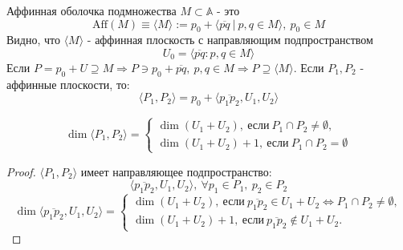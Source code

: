 \begin{definition}
    Аффинная оболочка подмножества $M\subset \mathbb{A}$ - это
    \[\text{Aff}(M)\equiv \langle M \rangle:=p_0+\langle\overline{pq} \ | \ p,q\in M\rangle,\ p_0\in M\]
    Видно, что $\langle M \rangle$ - аффинная плоскость с направляющим подпространством  
    \[U_0=\langle\overline{pq}: p,q\in M\rangle\]
    Если $P=p_0+U\supseteq M \Longrightarrow P\ni p_0+\overline{pq},\ p,q\in M \Longrightarrow P\supseteq \langle M \rangle$.
    Если $P_1, P_2$ - аффинные плоскости, то:
    \[\langle P_1,P_2 \rangle=p_0+\langle \overline{p_1p_2}, U_1, U_2 \rangle\]
\end{definition} 
\begin{theorem}
    \[\dim{\langle P_1,P_2 \rangle}=\begin{cases}
        \dim(U_1+U_2),\ \text{если}\ P_1\cap P_2\ne \emptyset,\\
        \dim(U_1+U_2)+1,\ \text{если}\ P_1\cap P_2= \emptyset
    \end{cases}\]
\end{theorem}
\begin{proof}
    $\langle P_1,P_2 \rangle$ имеет направляющее подпространство:
    \[\langle \overline{p_1p_2}, U_1, U_2 \rangle,\ \forall p_1\in P_1,\ p_2\in P_2\]
    \[\dim{\langle \overline{p_1p_2}, U_1, U_2 \rangle}=\begin{cases}
        \dim(U_1+U_2),\ \text{если}\ \overline{p_1p_2}\in U_1+U_2 \Longleftrightarrow P_1\cap P_2\ne \emptyset,\\
        \dim(U_1+U_2)+1,\ \text{если}\ \overline{p_1p_2}\not\in U_1+U_2.
    \end{cases}\]
\end{proof}





